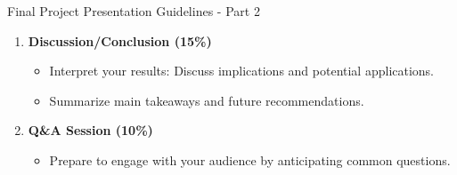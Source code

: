 \documentclass[aspectratio=169]{beamer}
\begin{document}
\begin{frame}[fragile]{Final Project Presentation Guidelines - Part 2}
    \begin{enumerate}[resume]
        \item \textbf{Discussion/Conclusion (15\%)} 
        \begin{itemize}
            \item Interpret your results: Discuss implications and potential applications.
            \item Summarize main takeaways and future recommendations.
        \end{itemize}

        \item \textbf{Q\&A Session (10\%)} 
        \begin{itemize}
            \item Prepare to engage with your audience by anticipating common questions.
        \end{itemize}
    \end{enumerate}
\end{frame}
\end{document}

